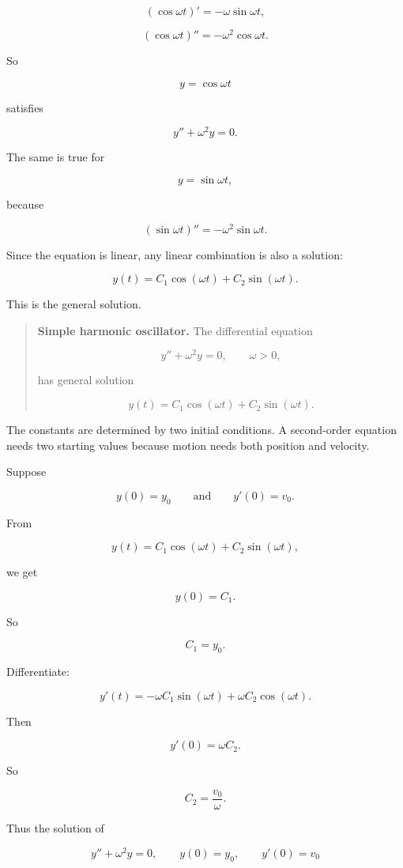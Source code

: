 \[
(\cos \omega t)'=-\omega\sin\omega t,
\]

\[
(\cos \omega t)''=-\omega^2\cos\omega t.
\]

So

\[
y=\cos\omega t
\]

satisfies

\[
y''+\omega^2y=0.
\]

The same is true for

\[
y=\sin\omega t,
\]

because

\[
(\sin \omega t)''=-\omega^2\sin\omega t.
\]

Since the equation is linear, any linear combination is also a solution:

\[
\boxed{
y(t)=C_1\cos(\omega t)+C_2\sin(\omega t).
}
\]

This is the general solution.

\begin{quote}
\textbf{Simple harmonic oscillator.}
The differential equation

\[
\boxed{
y''+\omega^2y=0,
\qquad \omega>0,
}
\]

has general solution

\[
\boxed{
y(t)=C_1\cos(\omega t)+C_2\sin(\omega t).
}
\]
\end{quote}

The constants are determined by two initial conditions.  A second-order equation needs
two starting values because motion needs both position and velocity.

Suppose

\[
y(0)=y_0
\qquad\text{and}\qquad
y'(0)=v_0.
\]

From

\[
y(t)=C_1\cos(\omega t)+C_2\sin(\omega t),
\]

we get

\[
y(0)=C_1.
\]

So

\[
C_1=y_0.
\]

Differentiate:

\[
y'(t)=-\omega C_1\sin(\omega t)+\omega C_2\cos(\omega t).
\]

Then

\[
y'(0)=\omega C_2.
\]

So

\[
C_2=\frac{v_0}{\omega}.
\]

Thus the solution of

\[
y''+\omega^2y=0,
\qquad
y(0)=y_0,
\qquad
y'(0)=v_0
\]

